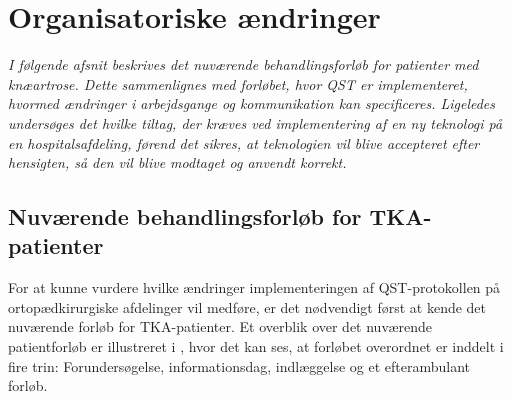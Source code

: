 \section{Organisatoriske ændringer}
\textit{I følgende afsnit beskrives det nuværende behandlingsforløb for patienter med knæartrose. Dette sammenlignes med forløbet, hvor QST er implementeret, hvormed ændringer i arbejdsgange og kommunikation kan specificeres. Ligeledes undersøges det hvilke tiltag, der kræves ved implementering af en ny teknologi på en hospitalsafdeling, førend det sikres, at teknologien vil blive accepteret efter hensigten, så den vil blive modtaget og anvendt korrekt.}


\subsection{Nuværende behandlingsforløb for TKA-patienter}
For at kunne vurdere hvilke ændringer implementeringen af QST-protokollen på ortopædkirurgiske afdelinger vil medføre, er det nødvendigt først at kende det nuværende forløb for TKA-patienter. Et overblik over det nuværende patientforløb er illustreret i , hvor det kan ses, at forløbet overordnet er inddelt i fire trin: Forundersøgelse, informationsdag, indlæggelse og et efterambulant forløb. 

